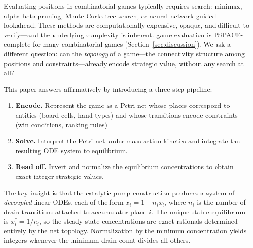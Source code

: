 \documentclass[11pt,a4paper]{article}
\begin{document}
Evaluating positions in combinatorial games typically requires search: minimax, alpha-beta pruning, Monte Carlo tree search, or neural-network-guided lookahead.
These methods are computationally expensive, opaque, and difficult to verify---and the underlying complexity is inherent: game evaluation is PSPACE-complete for many combinatorial games (Section~\ref{sec:discussion}).
We ask a different question: can the \emph{topology} of a game---the connectivity structure among positions and constraints---already encode strategic value, without any search at all?

This paper answers affirmatively by introducing a three-step pipeline:
\begin{enumerate}
  \item \textbf{Encode.}  Represent the game as a Petri net whose places correspond to entities (board cells, hand types) and whose transitions encode constraints (win conditions, ranking rules).
  \item \textbf{Solve.}  Interpret the Petri net under mass-action kinetics and integrate the resulting ODE system to equilibrium.
  \item \textbf{Read off.}  Invert and normalize the equilibrium concentrations to obtain exact integer strategic values.
\end{enumerate}

The key insight is that the catalytic-pump construction produces a system of \emph{decoupled} linear ODEs, each of the form $\dot{x}_i = 1 - n_i x_i$, where $n_i$ is the number of drain transitions attached to accumulator place~$i$.
The unique stable equilibrium is $x_i^* = 1/n_i$, so the steady-state concentrations are exact rationals determined entirely by the net topology.
Normalization by the minimum concentration yields integers whenever the minimum drain count divides all others.
\end{document}
